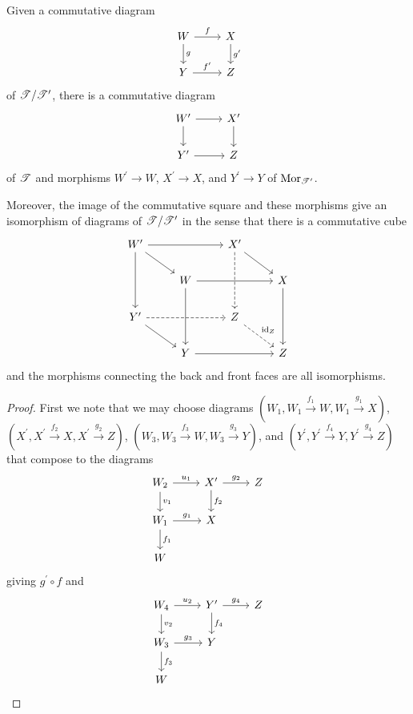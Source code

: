 \documentclass[dissertation.tex]{subfiles}
\begin{document}
\begin{lem}\label{VerdierLiftSquare}
  Given a commutative diagram
  $$\begin{tikzcd}
    W \arrow{r}{f}\arrow{d}{g} & X\arrow{d}{g^\prime}\\
    Y \arrow{r}{f^\prime} & Z
  \end{tikzcd}$$
  of $\mathscr{T}/\mathscr{T}^\prime$, there is a commutative diagram
  $$\begin{tikzcd}
    W^\prime \arrow{r}\arrow{d} & X^\prime\arrow{d}\\
    Y^\prime \arrow{r} & Z
  \end{tikzcd}$$
  of $\mathscr{T}$ and morphisms $W^\prime \to W$, $X^\prime \to X$, and $Y^\prime \to Y$ of $\operatorname{Mor}_{\mathscr{T}^\prime}$.
  
  Moreover, the image of the commutative square and these morphisms give an isomorphism of diagrams of $\mathscr{T}/\mathscr{T}^\prime$ in the sense that there is a commutative cube
  $$\begin{tikzcd}
    W^\prime\arrow{rr}\arrow{rd}\arrow{dd} & & X^\prime\arrow[dashed]{dd}\arrow{rd}\\
    & W \arrow{rr}\arrow{dd} & & X\arrow{dd}\\
    Y^\prime\arrow[dashed]{rr}\arrow{rd} & & Z\arrow[dashed]{rd}{\id_Z}\\
    & Y\arrow{rr} & & Z
  \end{tikzcd}$$
  and the morphisms connecting the back and front faces are all isomorphisms.
  \begin{proof}
    First we note that we may choose diagrams $(W_1, W_1 \overset{f_1}\to W, W_1 \overset{g_1}\to X)$, $(X^\prime, X^\prime \overset{f_2}\to X, X^\prime \overset{g_2}\to Z)$, $(W_3, W_3 \overset{f_3}\to W, W_3 \overset{g_3}\to Y)$, and $(Y^\prime, Y^\prime \overset{f_4}\to Y, Y^\prime \overset{g_4}\to Z)$
    that compose to the diagrams
    $$\begin{tikzcd}
      W_2 \arrow{r}{u_1}\arrow{d}{v_1} & X^\prime \arrow{r}{g_2}\arrow{d}{f_2} & Z\\
      W_1 \arrow{r}{g_1}\arrow{d}{f_1} & X\\
      W
    \end{tikzcd}$$
    giving $g^\prime \circ f$
    and
    $$\begin{tikzcd}
      W_4 \arrow{r}{u_2}\arrow{d}{v_2} & Y^\prime \arrow{r}{g_4}\arrow{d}{f_4} & Z\\
      W_3 \arrow{r}{g_3}\arrow{d}{f_3} & Y\\
      W
    \end{tikzcd}$$

\end{proof}
\end{lem}
\end{document}
